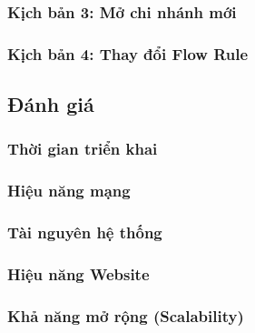 \subsubsection{Kịch bản 3: Mở chi nhánh mới}

\subsubsection{Kịch bản 4: Thay đổi Flow Rule}

\subsection{Đánh giá}

\subsubsection{Thời gian triển khai}

\subsubsection{Hiệu năng mạng}

\subsubsection{Tài nguyên hệ thống}

\subsubsection{Hiệu năng Website}

\subsubsection{Khả năng mở rộng (Scalability)}
